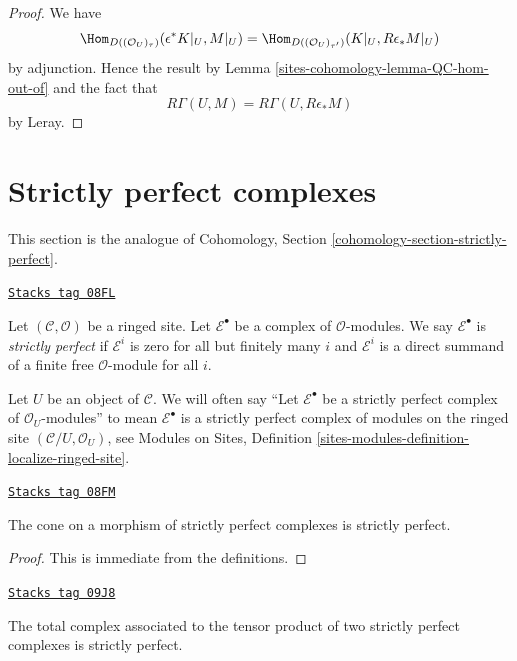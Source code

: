 \begin{proof}
We have
$$
\Hom_{D((\mathcal{O}_U)_\tau)}(\epsilon^*K|_U, M|_U) =
\Hom_{D((\mathcal{O}_U)_{\tau'})}(K|_U, R\epsilon_*M|_U)
$$
by adjunction. Hence the result by Lemma \ref{sites-cohomology-lemma-QC-hom-out-of}
and the fact that
$$
R\Gamma(U, M) = R\Gamma(U, R\epsilon_*M)
$$
by Leray.
\end{proof}

\section{Strictly perfect complexes}
\label{sites-cohomology-section-strictly-perfect}
This section is the analogue of
Cohomology, Section \ref{cohomology-section-strictly-perfect}.

\begin{definition}
\label{sites-cohomology-definition-strictly-perfect}
\href{https://stacks.math.columbia.edu/tag/08FL}{\texttt{Stacks tag 08FL}}

Let $(\mathcal{C}, \mathcal{O})$ be a ringed site.
Let $\mathcal{E}^\bullet$ be a complex of $\mathcal{O}$-modules.
We say $\mathcal{E}^\bullet$ is {\it strictly perfect}
if $\mathcal{E}^i$ is zero for all but finitely many $i$ and
$\mathcal{E}^i$ is a direct summand of a finite free
$\mathcal{O}$-module for all $i$.
\end{definition}

Let $U$ be an object of $\mathcal{C}$. We will often say
``Let $\mathcal{E}^\bullet$ be a strictly perfect complex of
$\mathcal{O}_U$-modules'' to mean $\mathcal{E}^\bullet$ is a strictly perfect
complex of modules on the ringed site $(\mathcal{C}/U, \mathcal{O}_U)$, see
Modules on Sites, Definition
\ref{sites-modules-definition-localize-ringed-site}.

\begin{lemma}[Cone]
\label{sites-cohomology-lemma-cone}
\href{https://stacks.math.columbia.edu/tag/08FM}{\texttt{Stacks tag 08FM}}

The cone on a morphism of strictly perfect complexes is
strictly perfect.
\end{lemma}

\begin{proof}
This is immediate from the definitions.
\end{proof}

\begin{lemma}[Tensor]
\label{sites-cohomology-lemma-tensor}
\href{https://stacks.math.columbia.edu/tag/09J8}{\texttt{Stacks tag 09J8}}

The total complex associated to the tensor product of two
strictly perfect complexes is strictly perfect.
\end{lemma}

